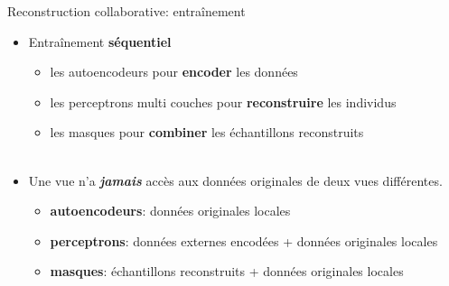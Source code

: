 \documentclass[hyperref={pdfpagelabels=false}]{beamer}
\begin{document}
    \begin{frame}{Reconstruction collaborative: entraînement}
        \begin{itemize}
            \item Entraînement \textbf{séquentiel}
                \begin{itemize}
                    \item les autoencodeurs pour \textbf{encoder} les données
                    \item les perceptrons multi couches pour 
                        \textbf{reconstruire} les individus
                    \item les masques pour \textbf{combiner} les échantillons 
                        reconstruits\\~\\
                \end{itemize}
            \item Une vue n'a \textbf{\textit{jamais}} accès aux données 
                originales de deux vues différentes.
                \begin{itemize}
                    \item \textbf{autoencodeurs}: données originales locales
                    \item \textbf{perceptrons}: données externes encodées + 
                        données originales locales
                    \item \textbf{masques}: échantillons reconstruits + données 
                        originales locales
                \end{itemize}
        \end{itemize}
    \end{frame}
\end{document}
